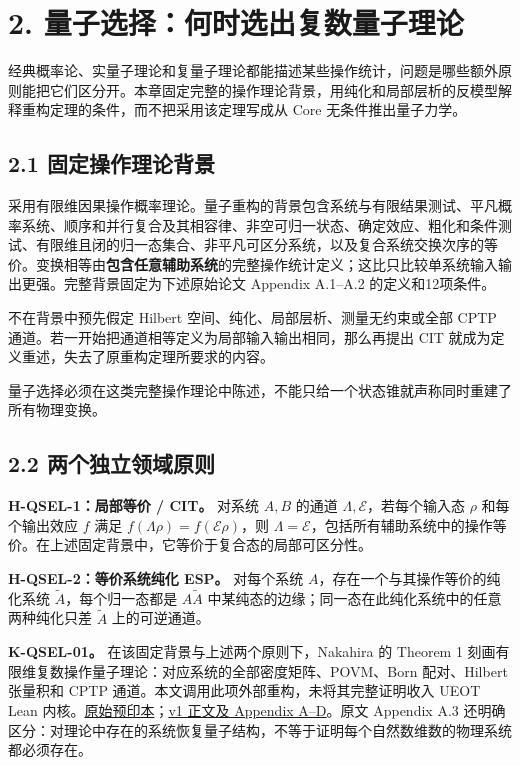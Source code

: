 \documentclass[
  11pt,
  oneside]{book}
\begin{document}
\chapter{2. 量子选择：何时选出复数量子理论}\label{ch-2}\hypertarget{ch-2}{}

经典概率论、实量子理论和复量子理论都能描述某些操作统计，问题是哪些额外原则能把它们区分开。本章固定完整的操作理论背景，用纯化和局部层析的反模型解释重构定理的条件，而不把采用该定理写成从
Core 无条件推出量子力学。

\section{2.1 固定操作理论背景}

采用有限维因果操作概率理论。量子重构的背景包含系统与有限结果测试、平凡概率系统、顺序和并行复合及其相容律、非空可归一状态、确定效应、粗化和条件测试、有限维且闭的归一态集合、非平凡可区分系统，以及复合系统交换次序的等价。变换相等由\textbf{包含任意辅助系统}的完整操作统计定义；这比只比较单系统输入输出更强。完整背景固定为下述原始论文
Appendix A.1--A.2 的定义和12项条件。

不在背景中预先假定 Hilbert 空间、纯化、局部层析、测量无约束或全部 CPTP
通道。若一开始把通道相等定义为局部输入输出相同，那么再提出 CIT
就成为定义重述，失去了原重构定理所要求的内容。

量子选择必须在这类完整操作理论中陈述，不能只给一个状态锥就声称同时重建了所有物理变换。

\section{2.2 两个独立领域原则}

\textbf{H-QSEL-1：局部等价 / CIT。} 对系统 \(A,B\) 的通道
\(\Lambda,\mathcal E\)，若每个输入态 \(\rho\) 和每个输出效应 \(f\) 满足
\(f(\Lambda\rho)=f(\mathcal E\rho)\)，则
\(\Lambda=\mathcal E\)，包括所有辅助系统中的操作等价。在上述固定背景中，它等价于复合态的局部可区分性。

\textbf{H-QSEL-2：等价系统纯化 ESP。} 对每个系统
\(A\)，存在一个与其操作等价的纯化系统 \(\widetilde A\)，每个归一态都是
\(A\widetilde A\) 中某纯态的边缘；同一态在此纯化系统中的任意两种纯化只差
\(\widetilde A\) 上的可逆通道。

\textbf{K-QSEL-01。} 在该固定背景与上述两个原则下，Nakahira 的 Theorem 1
刻画有限维复数操作量子理论：对应系统的全部密度矩阵、POVM、Born
配对、Hilbert 张量积和 CPTP
通道。本文调用此项外部重构，未将其完整证明收入 UEOT Lean
内核。\href{https://arxiv.org/abs/2605.23217}{原始预印本}；\href{https://arxiv.org/html/2605.23217v1}{v1
正文及 Appendix A--D}。原文 Appendix A.3
还明确区分：对理论中存在的系统恢复量子结构，不等于证明每个自然数维数的物理系统都必须存在。
\end{document}

